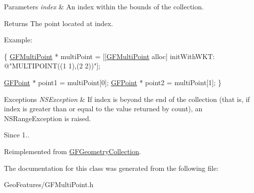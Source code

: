 \begin{DoxyParams}{Parameters}
{\em index} & An index within the bounds of the collection.\\
\hline
\end{DoxyParams}
\begin{DoxyReturn}{Returns}
The point located at index.
\end{DoxyReturn}
Example\+:


\begin{DoxyCode}
\{
   \hyperlink{interface_g_f_multi_point}{GFMultiPoint} * multiPoint = [[\hyperlink{interface_g_f_multi_point}{GFMultiPoint} alloc] initWithWKT: \textcolor{stringliteral}{@"MULTIPOINT((1
       1),(2 2))"}];

   \hyperlink{interface_g_f_point}{GFPoint} * point1 = multiPoint[0];
   \hyperlink{interface_g_f_point}{GFPoint} * point2 = multiPoint[1];
\}
\end{DoxyCode}



\begin{DoxyExceptions}{Exceptions}
{\em N\+S\+Exception} & If index is beyond the end of the collection (that is, if index is greater than or equal to the value returned by count), an N\+S\+Range\+Exception is raised.\\
\hline
\end{DoxyExceptions}
\begin{DoxySince}{Since}
1.. 
\end{DoxySince}


Reimplemented from \hyperlink{interface_g_f_geometry_collection_ac67dd4526580a8a38408e39c489a7503}{G\+F\+Geometry\+Collection}.



The documentation for this class was generated from the following file\+:\begin{DoxyCompactItemize}
\item 
Geo\+Features/G\+F\+Multi\+Point.\+h\end{DoxyCompactItemize}
